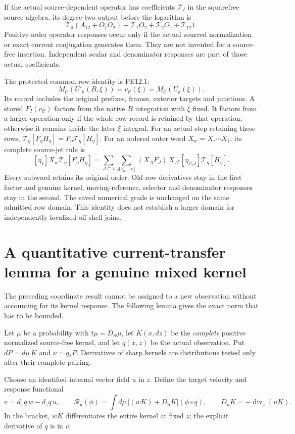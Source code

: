 \documentclass[11pt,letterpaper]{article}
\theoremstyle{remark}\newtheorem{remark}[theorem]{Remark}
\newcommand{\diver}{\operatorname{div}}\newcommand{\Ad}{\operatorname{Ad}}
\providecommand{\mathscr}{\mathcal}
\begin{document}
If the actual source-dependent operator has coefficients $\mathscr T_I$ in the squarefree source algebra, its degree-two output before the logarithm is
\[
 \mathscr T_0(A_{12}+O_1O_2)+\mathscr T_1O_2+
       \mathscr T_2O_1+\mathscr T_{12}1.
\]
Positive-order operator responses occur only if the actual sourced normalization or exact current conjugation generates them. They are not invented for a source-free insertion. Independent scalar and denominator responses are part of those actual coefficients.

The protected common-row identity is PE12.1:
\[
 M_{\mathcal C}(U'_k(B,\xi))=v_{\mathcal C}(\xi)
                         =M_{\mathcal C}(U_k(\xi)).
\]
Its record includes the original prefixes, frames, exterior targets and junctions. A stored $F_I(v_{\mathcal C})$ factors from the native $B$ integration with $\xi$ fixed. It factors from a larger operation only if the whole row record is retained by that operation; otherwise it remains inside the later $\xi$ integral.
For an actual step retaining these rows,
$\mathscr T_\eta[F_\eta H_\eta]=F_\eta\mathscr T_\eta[H_\eta]$.
For an ordered outer word $X_w=X_r\cdots X_1$, its complete source-jet rule is
\[
 [\eta_I]X_w\mathscr T_\eta[F_\eta H_\eta]
 =\sum_{J\subseteq I}\sum_{A\subseteq[r]}
   (X_AF_J)\,
   X_{A^c}[\eta_{I\setminus J}]\mathscr T_\eta[H_\eta].
\]
Every subword retains its original order. Old-row derivatives stay in the first factor and genuine kernel, moving-reference, selector and denominator responses stay in the second. The saved numerical grade is unchanged on the same admitted row domain. This identity does not establish a larger domain for independently localized off-shell joins.

\section{A quantitative current-transfer lemma for a genuine mixed kernel}

The preceding coordinate result cannot be assigned to a new observation without accounting for its kernel response. The following lemma gives the exact norm that has to be bounded.

Let $\mu$ be a probability with $t\mu=D_w\mu$, let $K(x,dz)$ be the \emph{complete} positive normalized source-free kernel, and let $q(x,z)$ be the actual observation. Put
$dP=d\mu\,K$ and $\nu=q_*P$. Derivatives of sharp kernels are distributions tested only after their complete pairing.

Choose an identified internal vector field $u$ in $z$. Define the target velocity and response functional
\begin{equation}\label{eq:transferdefs}
 v=d_xq\,w-d_zq\,u,\qquad
 \mathcal R_u(\phi)
 =
 \int d\mu\,\bigl[(wK)+D_uK\bigr](\phi\circ q),
 \qquad D_uK=-\diver_z(uK).
\end{equation}
In the bracket, $wK$ differentiates the entire kernel at fixed $z$; the explicit derivative of $q$ is in $v$.
\end{document}
